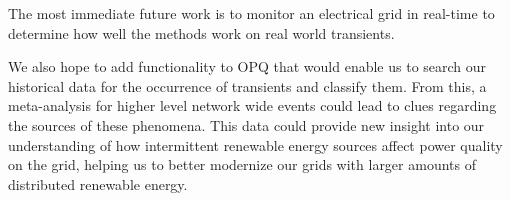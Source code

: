 \documentclass[10pt, conference, compsocconf]{IEEEtran}
\begin{document}
The most immediate future work is to monitor an electrical grid in real-time to determine how well the methods work on real world transients.

We also hope to add functionality to OPQ that would enable us to search our historical data for the occurrence of transients and classify them. From this, a meta-analysis for higher level network wide events could lead to clues regarding the sources of these phenomena. This data could provide new insight into our understanding of how intermittent renewable energy sources affect power quality on the grid, helping us to better modernize our grids with larger amounts of distributed renewable energy.





%
%
%
%
%




\end{document}
